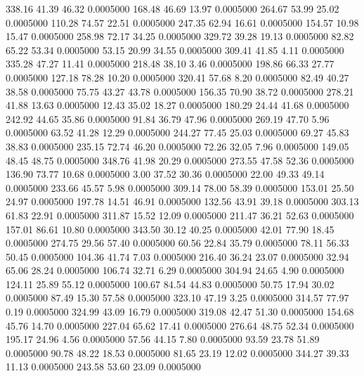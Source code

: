  338.16   41.39   46.32   0.0005000
 168.48   46.69   13.97   0.0005000
 264.67   53.99   25.02   0.0005000
 110.28   74.57   22.51   0.0005000
 247.35   62.94   16.61   0.0005000
 154.57   10.98   15.47   0.0005000
 258.98   72.17   34.25   0.0005000
 329.72   39.28   19.13   0.0005000
  82.82   65.22   53.34   0.0005000
  53.15   20.99   34.55   0.0005000
 309.41   41.85    4.11   0.0005000
 335.28   47.27   11.41   0.0005000
 218.48   38.10    3.46   0.0005000
 198.86   66.33   27.77   0.0005000
 127.18   78.28   10.20   0.0005000
 320.41   57.68    8.20   0.0005000
  82.49   40.27   38.58   0.0005000
  75.75   43.27   43.78   0.0005000
 156.35   70.90   38.72   0.0005000
 278.21   41.88   13.63   0.0005000
  12.43   35.02   18.27   0.0005000
 180.29   24.44   41.68   0.0005000
 242.92   44.65   35.86   0.0005000
  91.84   36.79   47.96   0.0005000
 269.19   47.70    5.96   0.0005000
  63.52   41.28   12.29   0.0005000
 244.27   77.45   25.03   0.0005000
  69.27   45.83   38.83   0.0005000
 235.15   72.74   46.20   0.0005000
  72.26   32.05    7.96   0.0005000
 149.05   48.45   48.75   0.0005000
 348.76   41.98   20.29   0.0005000
 273.55   47.58   52.36   0.0005000
 136.90   73.77   10.68   0.0005000
   3.00   37.52   30.36   0.0005000
  22.00   49.33   49.14   0.0005000
 233.66   45.57    5.98   0.0005000
 309.14   78.00   58.39   0.0005000
 153.01   25.50   24.97   0.0005000
 197.78   14.51   46.91   0.0005000
 132.56   43.91   39.18   0.0005000
 303.13   61.83   22.91   0.0005000
 311.87   15.52   12.09   0.0005000
 211.47   36.21   52.63   0.0005000
 157.01   86.61   10.80   0.0005000
 343.50   30.12   40.25   0.0005000
  42.01   77.90   18.45   0.0005000
 274.75   29.56   57.40   0.0005000
  60.56   22.84   35.79   0.0005000
  78.11   56.33   50.45   0.0005000
 104.36   41.74    7.03   0.0005000
 216.40   36.24   23.07   0.0005000
  32.94   65.06   28.24   0.0005000
 106.74   32.71    6.29   0.0005000
 304.94   24.65    4.90   0.0005000
 124.11   25.89   55.12   0.0005000
 100.67   84.54   44.83   0.0005000
  50.75   17.94   30.02   0.0005000
  87.49   15.30   57.58   0.0005000
 323.10   47.19    3.25   0.0005000
 314.57   77.97    0.19   0.0005000
 324.99   43.09   16.79   0.0005000
 319.08   42.47   51.30   0.0005000
 154.68   45.76   14.70   0.0005000
 227.04   65.62   17.41   0.0005000
 276.64   48.75   52.34   0.0005000
 195.17   24.96    4.56   0.0005000
  57.56   44.15    7.80   0.0005000
  93.59   23.78   51.89   0.0005000
  90.78   48.22   18.53   0.0005000
  81.65   23.19   12.02   0.0005000
 344.27   39.33   11.13   0.0005000
 243.58   53.60   23.09   0.0005000
